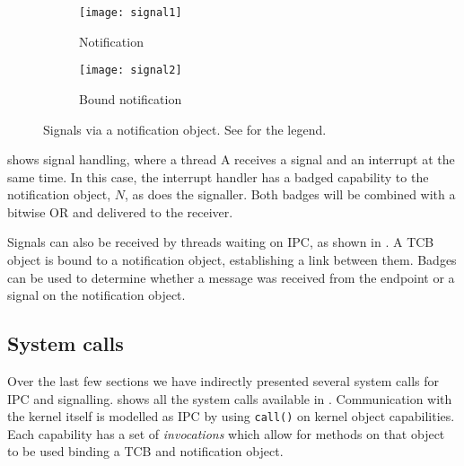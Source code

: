 \begin{figure}
    \centering
    \begin{subfigure}[h]{0.48\textwidth}
        \centering
        \texttt{[image: signal1]}
        \caption{Notification}
        \label{f:signal1}
    \end{subfigure}%
    \begin{subfigure}[h]{0.48\textwidth}
        \centering
        \texttt{[image: signal2]}
        \caption{Bound notification}
        \label{f:signal2}
    \end{subfigure}
    \label{f:signal}
    \caption{Signals via a notification object. See  for the legend.}
\end{figure}


 shows signal handling, where a thread A receives a signal and an interrupt at the
same time. In this case, the interrupt handler has a badged capability to the notification object,
$N$, as does the signaller. Both badges will be combined with a bitwise OR and delivered to the
receiver.

Signals can also be received by threads waiting on \gls{IPC}, as shown in . A
\gls{TCB} object is bound to a notification object, establishing a link between them. Badges can be
used to determine whether a message was received from the endpoint or a signal on the notification object.

\subsection{System calls}

Over the last few sections we have indirectly presented several system calls for \gls{IPC} and
signalling.  shows all the system calls available in \selfour. Communication
with the kernel itself is modelled as \gls{IPC} by using \texttt{call()} on kernel object
capabilities. Each capability has a set of \emph{invocations} which allow for methods on that object
to be used \eg binding a \gls{TCB} and notification object.


